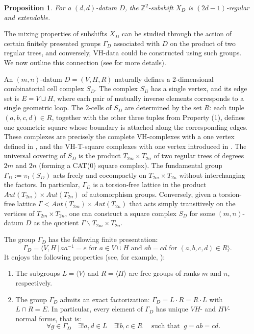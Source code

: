 \documentclass[12pt]{article}
\newtheorem{proposition}[theorem]{Proposition}
\theoremstyle{definition}
\begin{document}
\begin{proposition}
For a $(d,d)$-datum $D$, the $\mathbb{Z}^2$-subshift $X_D$ is $(2d-1)$-regular and extendable.
\end{proposition}
%

The mixing properties of subshifts $X_D$ can be studied through the action of certain finitely presented groups $\Gamma_D$ associated with $D$ on the product of two regular trees, and conversely, VH-data could be constructed using such groups. We now outline this connection (see \cite{BurgerMozes:Lattices,KimberleyRobertson2002} for more details).

An $(m,n)$-datum $D=(V,H,R)$ naturally defines a $2$-dimensional combinatorial cell complex $S_D$. The complex $S_D$ has a single vertex, and its edge set is $E=V\sqcup H$, where each pair of mutually inverse elements corresponds to a single geometric loop. The $2$-cells of $S_D$ are determined by the set $R$: each tuple $(a,b,c,d)\in R$, together with the other three tuples from Property (1), defines one geometric square whose boundary is attached along the corresponding edges. These complexes are precisely the complete VH-complexes with a one vertex defined in \cite{Wise:PhD,Wise:CSC}, and the VH-T-square complexes with one vertex introduced in \cite{BurgerMozes:Lattices}. The universal covering of $S_D$ is the product $T_{2m}\times T_{2n}$ of two regular trees of degrees $2m$ and $2n$ (forming a CAT(0) square complex). The fundamental group $\Gamma_D:=\pi_1(S_D)$ acts freely and cocompactly on $T_{2m}\times T_{2n}$ without interchanging the factors. In particular, $\Gamma_D$ is a torsion-free lattice in the product $Aut(T_{2m})\times Aut(T_{2n})$ of automorphism groups.
Conversely, given a torsion-free lattice $\Gamma<Aut(T_{2m})\times Aut(T_{2n})$ that acts simply transitively on the vertices of $T_{2m}\times T_{2n}$, one can construct a square complex $S_D$  for some $(m,n)$-datum $D$ as the quotient $\Gamma\backslash T_{2m}\times T_{2n}$.


The group $\Gamma_D$ has the following finite presentation:
\[
\Gamma_D=\langle V,H\,|\, aa^{-1}=e \mbox{ for $a\in V\cup H$ and } ab=cd \mbox{ for } (a,b,c,d)\in R\rangle.
\]
It enjoys the following properties (see, for example, \cite[Remark 1.11]{Wise:PhD}):
\begin{enumerate}
  \item[1)] The subgroups $L=\langle V\rangle$ and $R=\langle H\rangle$ are free groups of ranks $m$ and $n$, respectively.
  \item[2)] The group $\Gamma_D$ admits an exact factorization: $\Gamma_D=L\cdot R=R\cdot L$ with $L\cap R=E$.
In particular, every element of $\Gamma_D$ has unique $VH$- and $HV$-normal forms, that is:
\[
\forall g\in \Gamma_D \quad \exists! a,d\in L \quad \exists! b,c\in R \quad \mbox{ such that } \ g=ab=cd.
\]
\end{enumerate}
\end{document}
